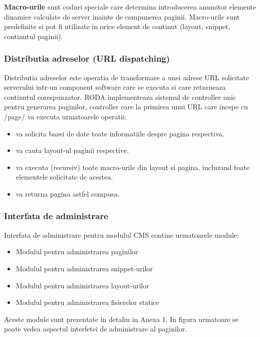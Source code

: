\documentclass[a4paper, 10pt]{article}
\begin{document}
{\bigskip

\textbf{Macro-urile} sunt coduri speciale care determina introducerea anumitor elemente dinamice calculate de server inainte de compunerea paginii. Macro-urile sunt predefinite si pot fi utilizate in orice element de continut (layout, snippet, continutul paginii). 

\bigskip


\subsubsection*{Distributia adreselor (URL dispatching)}

Distributia adreselor este operatia de transformare a unei adrese URL solicitate serverului intr-un component software care se executa si care returneaza continutul corespunzator. RODA implementeaza sistemul de controller unic pentru generarea paginilor, controller care la primirea unui URL care incepe cu /page/ va executa urmatoarele operatii:

\begin{itemize}
\item
va solicita bazei de date toate informatiile despre pagina respectiva. 
\item
va cauta layout-ul paginii respective.
\item
va executa (recursiv) toate macro-urile din layout si pagina, incluzand toate elementele solicitate de acestea.
\item
va returna pagina astfel compusa. 
\end{itemize}

\subsubsection*{Interfata de administrare}

Interfata de administrare pentru modulul CMS contine urmatoarele module:
\begin{itemize}
\item
Modulul pentru administrarea paginilor
\item
Modulul pentru administrarea snippet-urilor
\item
Modulul pentru administrarea layout-urilor
\item
Modulul pentru administrarea fisierelor statice
\end{itemize}

\bigskip

Aceste module sunt prezentate in detaliu in Anexa 1. 
In figura urmatoare se poate vedea aspectul interfetei de administrare al paginilor.

}
\end{document}
